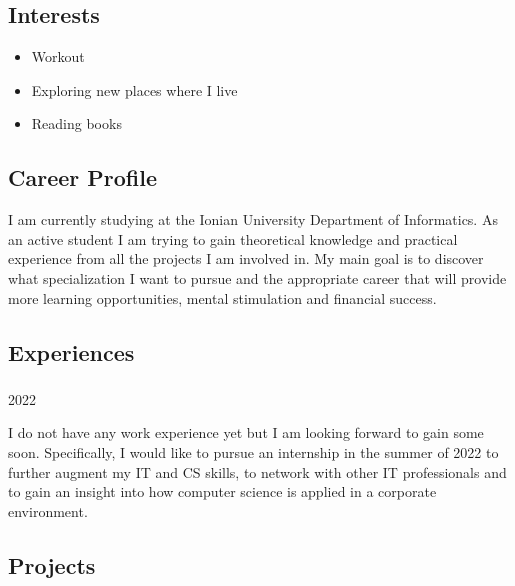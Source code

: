 \documentclass[
]{article}
\providecommand{\tightlist}{%
  \setlength{\itemsep}{0pt}\setlength{\parskip}{0pt}}
\begin{document}
\hypertarget{interests}{%
\subsection{Interests}\label{interests}}

\begin{itemize}
\tightlist
\item
  Workout
\item
  Exploring new places where I live
\item
  Reading books
\end{itemize}

\hypertarget{career-profile}{%
\subsection{\texorpdfstring{{ \emph{} \emph{} } Career
Profile}{    Career Profile}}\label{career-profile}}

I am currently studying at the Ionian University Department of
Informatics. As an active student I am trying to gain theoretical
knowledge and practical experience from all the projects I am involved
in. My main goal is to discover what specialization I want to pursue and
the appropriate career that will provide more learning opportunities,
mental stimulation and financial success.

\hypertarget{experiences}{%
\subsection{\texorpdfstring{{ \emph{} \emph{} }
Experiences}{    Experiences}}\label{experiences}}

\hypertarget{section}{%
\subsubsection{}\label{section}}

2022

I do not have any work experience yet but I am looking forward to gain
some soon. Specifically, I would like to pursue an internship in the
summer of 2022 to further augment my IT and CS skills, to network with
other IT professionals and to gain an insight into how computer science
is applied in a corporate environment.

\hypertarget{projects}{%
\subsection{\texorpdfstring{{ \emph{} \emph{} }
Projects}{    Projects}}\label{projects}}
\end{document}
